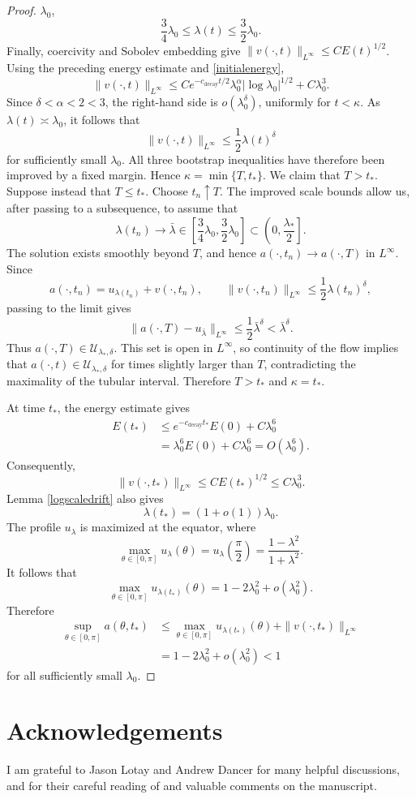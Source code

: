 \documentclass[11pt,a4paper]{article}
\numberwithin{equation}{section}
\theoremstyle{plain}
\theoremstyle{remark}
\begin{document}
\begin{proof}
$\lambda_0$,
$$
\frac34\lambda_0
\leq
\lambda(t)
\leq
\frac32\lambda_0.
$$
Finally, coercivity and Sobolev embedding give $\|v(\cdot,t)\|_{L^\infty}
\leq
CE(t)^{1/2}$. Using the preceding energy estimate and
\eqref{initialenergy},
$$
\|v(\cdot,t)\|_{L^\infty}
\leq
Ce^{-c_{\mathrm{decay}} t/2}
\lambda_0^\alpha
\left|\log\lambda_0\right|^{1/2}
+
C\lambda_0^3.
$$
Since $\delta<\alpha<2<3$, the right-hand side is
$o(\lambda_0^\delta)$, uniformly for $t<\kappa$. As
$\lambda(t)\asymp\lambda_0$, it follows that
$$
\|v(\cdot,t)\|_{L^\infty}
\leq
\frac12\lambda(t)^\delta
$$
for sufficiently small $\lambda_0$.
All three bootstrap inequalities have therefore been improved by a
fixed margin. Hence $\kappa=\min\{T,t_*\}$. We claim that $T>t_*$. Suppose instead that $T\leq t_*$. Choose
$t_n\uparrow T$. The improved scale bounds allow us, after passing
to a subsequence, to assume that
$$
\lambda(t_n)\longrightarrow\bar\lambda
\in
\left[\frac34\lambda_0,\frac32\lambda_0\right]
\subset
\left(0,\frac{\lambda_*}{2}\right].
$$
The solution exists smoothly beyond $T$, and hence
$a(\cdot,t_n)\to a(\cdot,T)$ in $L^\infty$. Since
$$
a(\cdot,t_n)
=
u_{\lambda(t_n)}+v(\cdot,t_n),
\qquad
\|v(\cdot,t_n)\|_{L^\infty}
\leq
\frac12\lambda(t_n)^\delta,
$$
passing to the limit gives
$$
\|a(\cdot,T)-u_{\bar\lambda}\|_{L^\infty}
\leq
\frac12\bar\lambda^\delta
<
\bar\lambda^\delta.
$$
Thus $a(\cdot,T)\in\mathcal U_{\lambda_*,\delta}$. This set is open
in $L^\infty$, so continuity of the flow implies that
$a(\cdot,t)\in\mathcal U_{\lambda_*,\delta}$ for times slightly
larger than $T$, contradicting the maximality of the tubular
interval. Therefore $T>t_*$ and $\kappa=t_*$.

At time $t_*$, the energy estimate gives
$$
\begin{aligned}
E(t_*)
&\leq
e^{-c_{\mathrm{decay}} t_*}E(0)+C\lambda_0^6\\
&=
\lambda_0^6E(0)+C\lambda_0^6
=
O(\lambda_0^6).
\end{aligned}
$$
Consequently,
$$
\|v(\cdot,t_*)\|_{L^\infty}
\leq
CE(t_*)^{1/2}
\leq
C\lambda_0^3.
$$ 
Lemma \ref{logscaledrift} also gives
$$
\lambda(t_*)=(1+o(1))\lambda_0.
$$
The profile $u_\lambda$ is maximized at the equator, where
$$
\max_{\theta\in[0,\pi]}u_\lambda(\theta)
=
u_\lambda\left(\frac{\pi}{2}\right)
=
\frac{1-\lambda^2}{1+\lambda^2}.
$$
It follows that
$$
\max_{\theta\in[0,\pi]}u_{\lambda(t_*)}(\theta)
=
1-2\lambda_0^2+o(\lambda_0^2).
$$
Therefore
$$
\begin{aligned}
\sup_{\theta\in[0,\pi]}a(\theta,t_*)
&\leq
\max_{\theta\in[0,\pi]}u_{\lambda(t_*)}(\theta)
+
\|v(\cdot,t_*)\|_{L^\infty}\\
&=
1-2\lambda_0^2+o(\lambda_0^2)
<
1
\end{aligned}
$$
for all sufficiently small $\lambda_0$.
\end{proof}

\section*{Acknowledgements}

I am grateful to Jason Lotay and Andrew Dancer for many helpful discussions,
and for their careful reading of and valuable comments on the manuscript.

\bigskip

 
 
\end{document}
